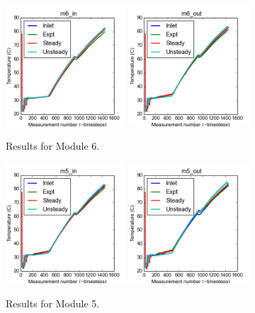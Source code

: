 \documentclass{article}
\begin{document}
\begin{figure}[!ht]
\centering
\includegraphics[width=0.4\textwidth]{../../data/ICSolar/images/Mar06_m6_in_compare.png}\hspace{0.05\textwidth}
\includegraphics[width=0.4\textwidth]{../../data/ICSolar/images/Mar06_m6_out_compare.png}\hspace{0.05\textwidth}\\
\caption{Results for Module 6.}\end{figure}
\begin{figure}[!ht]
\centering
\includegraphics[width=0.4\textwidth]{../../data/ICSolar/images/Mar06_m5_in_compare.png}\hspace{0.05\textwidth}
\includegraphics[width=0.4\textwidth]{../../data/ICSolar/images/Mar06_m5_out_compare.png}\hspace{0.05\textwidth}\\
\caption{Results for Module 5.}\end{figure}
\end{document}
